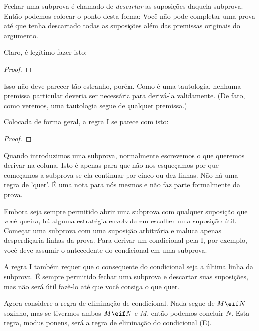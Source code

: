 Fechar uma subprova é chamado de \emph{descartar} as suposições daquela subprova. Então podemos colocar o ponto desta forma: Você não pode completar uma prova até que tenha descartado todas as suposições além das premissas originais do argumento.

Claro, é legítimo fazer isto:

\begin{proof}
	\open
		 
	\close
	 
\end{proof}

Isso não deve parecer tão estranho, porém. Como \eif{} é uma tautologia, nenhuma premissa particular deveria ser necessária para derivá-la validamente. (De fato, como veremos, uma tautologia segue de qualquer premissa.)

Colocada de forma geral, a regra {\eif}I se parece com isto:

\begin{proof}
	\open
		 
	\close
\end{proof}

Quando introduzimos uma subprova, normalmente escrevemos o que queremos derivar na coluna. Isto é apenas para que não nos esqueçamos por que começamos a subprova se ela continuar por cinco ou dez linhas. Não há uma regra de 'quer'. É uma nota para nós mesmos e não faz parte formalmente da prova.

Embora seja sempre permitido abrir uma subprova com qualquer suposição que você queira, há alguma estratégia envolvida em escolher uma suposição útil. Começar uma subprova com uma suposição arbitrária e maluca apenas desperdiçaria linhas da prova. Para derivar um condicional pela {\eif}I, por exemplo, você deve assumir o antecedente do condicional em uma subprova.

A regra {\eif}I também requer que o consequente do condicional seja a última linha da subprova. É sempre permitido fechar uma subprova e descartar suas suposições, mas não será útil fazê-lo até que você consiga o que quer.

Agora considere a regra de eliminação do condicional. Nada segue de $M\eif N$ sozinho, mas se tivermos ambos $M \eif N$ e $M$, então podemos concluir $N$. Esta regra, modus ponens, será a regra de eliminação do condicional ({\eif}E).

